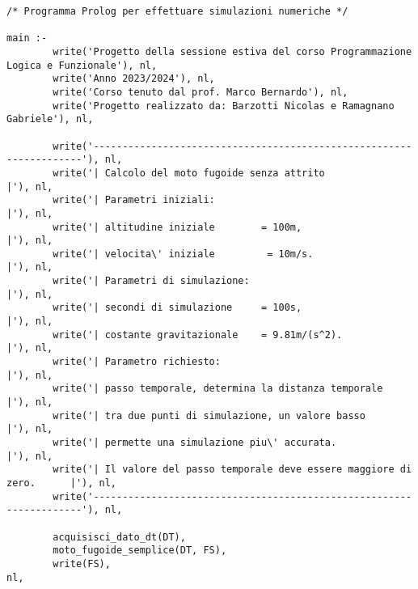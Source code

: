 
\scriptsize
\begin{verbatim}
/* Programma Prolog per effettuare simulazioni numeriche */

main :- 
        write('Progetto della sessione estiva del corso Programmazione Logica e Funzionale'), nl,
        write('Anno 2023/2024'), nl,
        write('Corso tenuto dal prof. Marco Bernardo'), nl,
        write('Progetto realizzato da: Barzotti Nicolas e Ramagnano Gabriele'), nl, 

        write('--------------------------------------------------------------------'), nl,
        write('| Calcolo del moto fugoide senza attrito                           |'), nl,
        write('| Parametri iniziali:                                              |'), nl,
        write('| altitudine iniziale        = 100m,                               |'), nl,
        write('| velocita\' iniziale         = 10m/s.                              |'), nl,
        write('| Parametri di simulazione:                                        |'), nl,
        write('| secondi di simulazione     = 100s,                               |'), nl,
        write('| costante gravitazionale    = 9.81m/(s^2).                        |'), nl,
        write('| Parametro richiesto:                                             |'), nl,
        write('| passo temporale, determina la distanza temporale                 |'), nl,
        write('| tra due punti di simulazione, un valore basso                    |'), nl,
        write('| permette una simulazione piu\' accurata.                          |'), nl,
        write('| Il valore del passo temporale deve essere maggiore di zero.      |'), nl,
        write('--------------------------------------------------------------------'), nl,

        acquisisci_dato_dt(DT),                                                        
        moto_fugoide_semplice(DT, FS),
        write(FS),                                                                     nl,


\end{verbatim}
